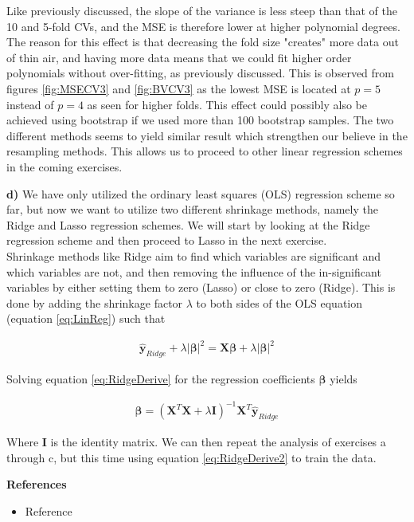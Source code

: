 \documentclass[12pt,a4paper]{article}
\begin{document}
\noindent Like previously discussed, the slope of the variance is less steep than that of the 10 and 5-fold CVs, and the MSE is therefore lower at higher polynomial degrees. The reason for this effect is that decreasing the fold size "creates" more data out of thin air, and having more data means that we could fit higher order polynomials without over-fitting, as previously discussed. This is observed from figures \ref{fig:MSECV3} and \ref{fig:BVCV3} as the lowest MSE is located at $p = 5$ instead of $p = 4$ as seen for higher folds. This effect could possibly also be achieved using bootstrap if we used more than 100 bootstrap samples. The two different methods seems to yield similar result which strengthen our believe in the resampling methods. This allows us to proceed to other linear regression schemes in the coming exercises.

\newpage

\noindent \textbf{d)} We have only utilized the ordinary least squares (OLS) regression scheme so far, but now we want to utilize two different shrinkage methods, namely the Ridge and Lasso regression schemes. We will start by looking at the Ridge regression scheme and then proceed to Lasso in the next exercise. 
\\
Shrinkage methods like Ridge aim to find which variables are significant and which variables are not, and then removing the influence of the in-significant variables by either setting them to zero (Lasso) or close to zero (Ridge). This is done by adding the shrinkage factor $\lambda$ to both sides of the OLS equation (equation \ref{eq:LinReg}) such that

\begin{equation}\label{eq:RidgeDerive}
\begin{aligned}
\boldsymbol{\hat{y}}_{Ridge} + \lambda |\boldsymbol{\beta}|^2 = \textbf{X}\boldsymbol{\beta} + \lambda  |\boldsymbol{\beta}|^2
\end{aligned}
\end{equation}

\noindent Solving equation \ref{eq:RidgeDerive} for the regression coefficients $\boldsymbol{\beta}$ yields

\begin{equation}\label{eq:RidgeDerive2}
\begin{aligned}
\boldsymbol{\beta} = (\textbf{X}^T \textbf{X} + \lambda \textbf{I})^{-1} \textbf{X}^T \boldsymbol{\hat{y}}_{Ridge}
\end{aligned}
\end{equation}

\noindent Where $\textbf{I}$ is the identity matrix. We can then repeat the analysis of exercises a through c, but this time using equation \ref{eq:RidgeDerive2} to train the data. 

\newpage

\begin{center}
\Large{\textbf{References}}
\end{center}

\begin{itemize}
  \item Reference
\end{itemize}
\end{document}

